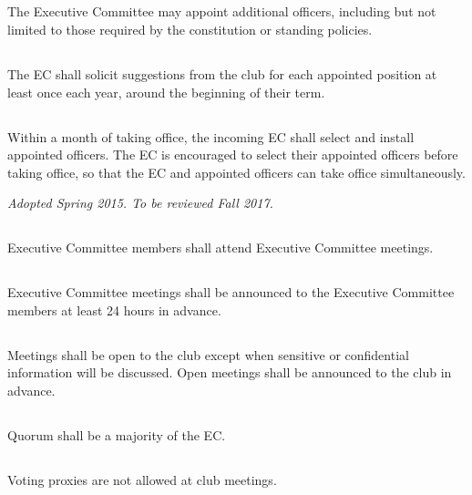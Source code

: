 \documentclass{bylaws}
\newcommand{\sptimes}[2]{\emph{Adopted #1. To be reviewed #2.}}
\begin{document}

\subsection{}The Executive Committee may appoint additional officers, including but not limited to those required by the constitution or standing policies.
\subsection{}The EC shall solicit suggestions from the club for each appointed position at least once each year, around the beginning of their term.
\subsection{}Within a month of taking office, the incoming EC shall select and install appointed officers. The EC is encouraged to select their appointed officers before taking office, so that the EC and appointed officers can take office simultaneously.


\sptimes{Spring 2015}{Fall 2017}


\subsection{}Executive Committee members shall attend Executive Committee meetings.
\subsection{}Executive Committee meetings shall be announced to the Executive Committee members at least 24 hours in advance.
\subsection{}Meetings shall be open to the club except when sensitive or confidential information will be discussed. Open meetings shall be announced to the club in advance.
\subsection{}Quorum shall be a majority of the EC.

\subsection{}Voting proxies are not allowed at club meetings.
\end{document}
